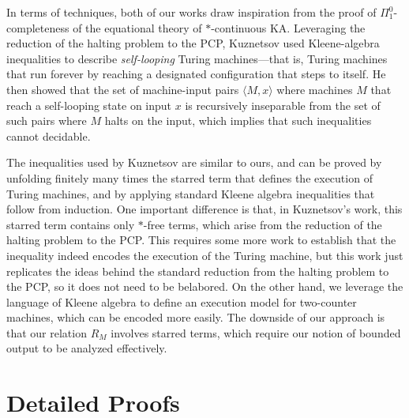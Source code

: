 \documentclass[11pt,a4paper]{amsart}
\theoremstyle{definition}
\begin{document}
In terms of techniques, both of our works draw inspiration from the proof of
$ \Pi _1^0$-completeness of the equational theory of $*$-continuous
KA. Leveraging the reduction of the halting problem to the PCP, Kuznetsov used
Kleene-algebra inequalities to describe \emph{self-looping} Turing
machines---that is, Turing machines that run forever by reaching a designated
configuration that steps to itself.  He then showed that the set of machine-input pairs
$ \langle M ,x \rangle $ where machines $M$ that reach a self-looping state on
input $x$ is recursively inseparable from the set of such pairs where $M$ halts
on the input, which implies that such inequalities cannot decidable.

The inequalities used by Kuznetsov are similar to ours, and can be proved by
unfolding finitely many times the starred term that defines the execution of
Turing machines, and by applying standard Kleene algebra inequalities that
follow from induction.  One important difference is that, in Kuznetsov's work,
this starred term contains only $*$-free terms, which arise from the reduction
of the halting problem to the PCP.  This requires some more work to establish
that the inequality indeed encodes the execution of the Turing machine, but this
work just replicates the ideas behind the standard reduction from the halting
problem to the PCP, so it does not need to be belabored. On the other hand, we
leverage the language of Kleene algebra to define an execution model for
two-counter machines, which can be encoded more easily.  The downside of our
approach is that our relation $R_M$ involves starred terms, which require our
notion of bounded output to be analyzed effectively.

\appendix
\section{Detailed Proofs}
\printProofs
\end{document}
